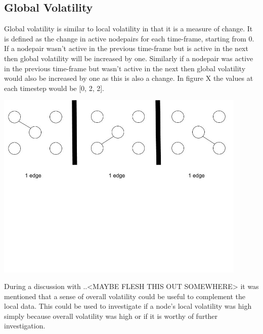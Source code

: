 
\subsection{Global Volatility}

Global volatility is similar to local volatility in that it is a measure of change. It is defined as the change in active nodepairs for each time-frame, starting from 0. If a nodepair wasn't active in the previous time-frame but is active in the next then global volatility will be increased by one. Similarly if a nodepair was active in the previous time-frame but wasn't active in the next then global volatility would also be increased by one as this is also a change. In figure X the values at each timestep would be [0, 2, 2].

\begin{center}
\includegraphics[trim={0 10cm 0 -1cm}, width=120mm]{./Figures/volatility3.jpg}
\end{center}

During a discussion with ..<MAYBE FLESH THIS OUT SOMEWHERE> it was mentioned that a sense of overall volatility could be useful to complement the local data. This could be used to investigate if a node's local volatility was high simply because overall volatility was high or if it is worthy of further investigation.



